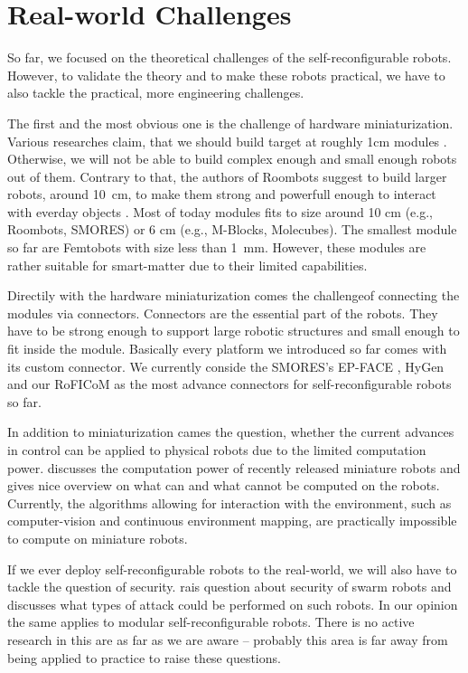 \section{Real-world Challenges}\label{sec:mixed-challenges}

So far, we focused on the theoretical challenges of the self-reconfigurable
robots. However, to validate the theory and to make these robots practical, we
have to also tackle the practical, more engineering challenges.

The first and the most obvious one is the challenge of hardware miniaturization.
Various researches claim, that we should build target at roughly 1cm modules
\cite{1285597, DBLP:conf/ieeealife/Christensen07}. Otherwise, we will not be
able to build complex enough and small enough robots out of them. Contrary to
that, the authors of Roombots suggest to build larger robots, around 10~cm, to
make them strong and powerfull enough to interact with everday objects
\cite{DBLP:conf/icra/SprowitzBDI09}. Most of today modules fits to size around
10 cm (e.g., Roombots, SMORES) or 6 cm (e.g., M-Blocks, Molecubes). The smallest
module so far are Femtobots \cite{Femtobots} with size less than 1~mm. However,
these modules are rather suitable for smart-matter due to their limited
capabilities.

Directily with the hardware miniaturization comes the challengeof connecting the
modules via connectors. Connectors are the essential part of the robots. They
have to be strong enough to support large robotic structures and small enough to
fit inside the module. Basically every platform we introduced so far comes with
its custom connector. We currently conside the SMORES's EP-FACE
\cite{DBLP:conf/iros/TosunDLY16}, HyGen \cite{DBLP:conf/iros/ParrottDG14} and
our RoFICoM \cite{DBLP:conf/iros/MrazekB19} as the most advance connectors for
self-reconfigurable robots so far.

In addition to miniaturization cames the question, whether the current advances
in control can be applied to physical robots due to the limited computation
power. \textcite{DBLP:journals/ral/Trenkwalder19} discusses the computation
power of recently released miniature robots and gives nice overview on what can
and what cannot be computed on the robots. Currently, the algorithms allowing
for interaction with the environment, such as computer-vision and continuous
environment mapping, are practically impossible to compute on miniature robots.

If we ever deploy self-reconfigurable robots to the real-world, we will also
have to tackle the question of security. \textcite{DBLP:conf/icas/HigginsTM09}
rais question about security of swarm robots and discusses what types of
attack could be performed on such robots. In our opinion the same applies to
modular self-reconfigurable robots. There is no active research in this are as
far as we are aware -- probably this area is far away from being applied to
practice to raise these questions.

